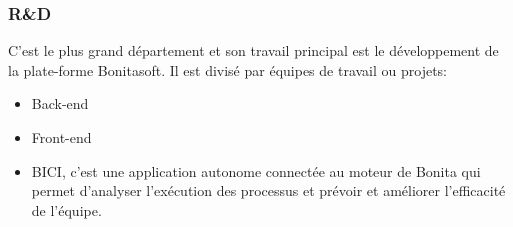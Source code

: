\subsubsection{R\&D}
C'est le plus grand département et son travail principal est le développement de la plate-forme Bonitasoft.
Il est divisé par équipes de travail ou projets:
\begin{itemize}
  \item Back-end
  \item Front-end
  \item BICI, c'est une application autonome connectée au moteur de Bonita qui permet d'analyser l'exécution
   des processus et prévoir et améliorer l'efficacité de l'équipe.
\end{itemize}
